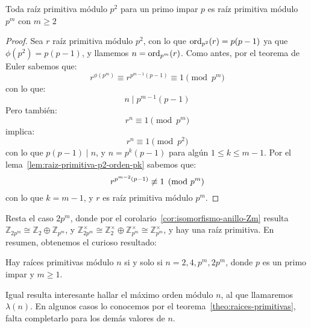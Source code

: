   \begin{theorem}
    \label{theo:raiz-primitiva-pk}
    Toda raíz primitiva módulo \(p^2\) para un primo impar \(p\)
    es raíz primitiva módulo \(p^m\) con \(m \ge 2\)
  \end{theorem}
  \begin{proof}
    Sea \(r\) raíz primitiva módulo \(p^2\),
    con lo que \(\operatorname{ord}_{p^2} (r) = p (p - 1)\)
    ya que \(\phi(p^2) = p (p - 1)\),
    y llamemos \(n = \operatorname{ord}_{p^m} (r)\).
    Como antes,
    por el teorema de Euler sabemos que:
    \begin{equation*}
      r^{\phi(p^m)}
	\equiv r^{p^{m - 1} (p - 1)} \equiv 1 \pmod{p^m}
    \end{equation*}
    con lo que:
    \begin{equation*}
      n \mid p^{m - 1} (p - 1)
    \end{equation*}
    Pero también:
    \begin{equation*}
      r^n
	\equiv 1 \pmod{p^m}
    \end{equation*}
    implica:
    \begin{equation*}
      r^n
	\equiv 1 \pmod{p^2}
    \end{equation*}
    con lo que \(p (p - 1) \mid n\),
    y \(n = p^k (p - 1)\) para algún \(1 \le k \le m - 1\).
    Por el lema~\ref{lem:raiz-primitiva-p2-orden-pk} sabemos que:
    \begin{equation*}
      r^{p^{m - 2} (p - 1)}
	\centernot\equiv 1 \pmod{p^m}
    \end{equation*}
    con lo que \(k = m - 1\),
    y \(r\) es raíz primitiva módulo \(p^m\).
  \end{proof}

  Resta el caso \(2 p^m\),
  donde por el corolario~\ref{cor:isomorfismo-anillo-Zm} resulta
  \(\mathbb{Z}_{2 p^m} \cong \mathbb{Z}_2 \oplus \mathbb{Z}_{p^m}\),
  y \(\mathbb{Z}^\times_{2 p^m}
	\cong \mathbb{Z}^\times_2 \oplus \mathbb{Z}^\times_{p^m}
	\cong \mathbb{Z}^\times_{p^m}\),
  y hay una raíz primitiva.
  En resumen,
  obtenemos el curioso resultado:
  \begin{theorem}
    \label{theo:raices-primitivas}
    Hay raíces primitivas módulo \(n\) si y solo si
    \(n = 2, 4, p^m, 2 p^m\),
    donde \(p\) es un primo impar y \(m \ge 1\).
  \end{theorem}

  Igual resulta interesante hallar el máximo orden módulo \(n\),
  al que llamaremos \(\lambda(n)\).%
  En algunos casos
  lo conocemos por el teorema~\ref{theo:raices-primitivas},
  falta completarlo para los demás valores de \(n\).

